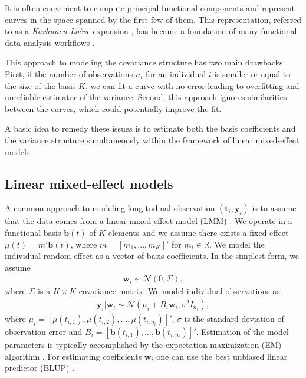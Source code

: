 \documentclass[preprint]{imsart}
\numberwithin{equation}{section}
\theoremstyle{plain}
\newcommand{\cN}{\mathcal{N}}
\newcommand{\R}{\mathbb{R}}
\newcommand{\bb}{\mathbf{b}}
\newcommand{\bw}{\mathbf{w}}
\begin{document}
It is often convenient to compute principal functional components and represent curves in the space spanned by the first few of them. This representation, referred to as a {\it Karhunen-Lo\`eve} expansion \citep{watanabe1965karhunen,kosambi2016statistics}, has became a foundation of many functional data analysis workflows \citep{ramsay1991some,yao2005linear,cnaan1997tutorial,laird1988missing,horvath2012inference,besse1997simultaneous}. %

This approach to modeling the covariance structure has two main drawbacks. First, if the number of observations $n_i$ for an individual $i$ is smaller or equal to the size of the basis $K$, we can fit a curve with no error leading to overfitting and unreliable estimator of the variance. Second, this approach ignores similarities between the curves, which could potentially improve the fit.

A basic idea to remedy these issues is to estimate both the basis coefficients and the variance structure simultaneously within the framework of linear mixed-effect models.

\subsection{Linear mixed-effect models}\label{ss:lmm}

A common approach to modeling longitudinal observation $(\mathbf{t}_i, \mathbf{y}_i)$ is to assume that the data comes from a linear mixed-effect model (LMM) \citep{verbeke1997linear, zeger1988models}. We operate in a functional basis $\bb(t)$ of $K$ elements and we assume there exists a fixed effect $\mu(t) = m' \bb(t)$, where $m = [m_1,...,m_K]'$ for $m_i \in \R$. We model the individual random effect as a vector of basis coefficients. In the simplest form, we assume
\begin{align}\label{eq:latent-probabilistic}
 \mathbf{w}_i \sim \cN(0, \Sigma),
\end{align}
where $\Sigma$ is a $K \times K$ covariance matrix. We model individual observations as
\begin{align}\label{eq:probabilistic}
 \mathbf{y}_i|\mathbf{w}_i \sim \cN(\mu_i + B_i\mathbf{w}_i, \sigma^2I_{n_i}),
\end{align}
where $\mu_i = [\mu(t_{i,1}),\mu(t_{i,2}),...,\mu(t_{i,n_i})]'$, $\sigma$ is the standard deviation of observation error and $B_i = [\bb(t_{i,1}),...,\bb(t_{i,n_i})]'$. Estimation of the model parameters is typically accomplished by the expectation-maximization (EM) algorithm \citep{laird1982random}. For estimating coefficients $\bw_i$ one can use the best unbiased linear predictor (BLUP) \citep{henderson1950estimation,robinson1991blup}. %
\end{document}
